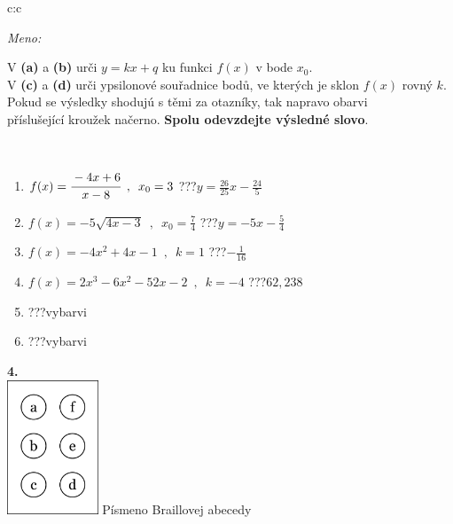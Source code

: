 \documentclass[10pt]{report}
\begin{document}
\begin{tabular}{c:c}
\begin{minipage}[c][104.5mm][t]{0.5\linewidth}
\begin{center}
\textit{Meno:}\phantom{xxxxxxxxxxxxxxxxxxxxxxxxxxxxxxxxxxxxxxxxxxxxxxxxxxxxxxxxxxxxxxxxx}\\[5mm]
\begin{minipage}{0.95\linewidth}
\begin{center}
V \textbf{(a)} a \textbf{(b)} urči  $y = kx + q$ ku funkci $f(x)$ v bode $x_0$.\\V \textbf{(c)} a \textbf{(d)} urči ypsilonové souřadnice bodů, ve kterých je sklon $f(x)$ rovný $k$.\\Pokud se výsledky shodujú s těmi za otazníky, tak napravo obarvi\\příslušející kroužek načerno. \textbf{Spolu odevzdejte výsledné slovo}.
\end{center}
\end{minipage}
\\[1mm]
\begin{minipage}{0.79\linewidth}
\begin{center}
\begin{varwidth}{\linewidth}
\begin{enumerate}
\small
\item $f(x)=\cfrac{-4x+6}{x-8}\enspace , \enspace x_0=3$\quad \dotfill\; ???\;\dotfill \quad $y = \frac{26}{25}x-\frac{24}{5}$
\item $f(x)=-5\sqrt{4x-3}\enspace , \enspace x_0=\frac{7}{4}$\quad \dotfill\; ???\;\dotfill \quad $y = -5x-\frac{5}{4}$
\item $f(x)=-4x^2+4x-1\enspace , \enspace k=1$\quad \dotfill\; ???\;\dotfill \quad $-\frac{1}{16}$
\item $f(x)=2x^3-6x^2-52x-2\enspace , \enspace k=-4$\quad \dotfill\; ???\;\dotfill \quad $62 , 238$
\item \quad \dotfill\; ???\;\dotfill \quad vybarvi
\item \quad \dotfill\; ???\;\dotfill \quad vybarvi
\end{enumerate}
\end{varwidth}
\end{center}
\end{minipage}
\begin{minipage}{0.20\linewidth}
\begin{center}
{\Huge\bfseries 4.} \\[2mm]
\includegraphics[height=40mm]{../images/braille.png}
{\small Písmeno Braillovej abecedy}
\end{center}
\end{minipage}
\end{center}
\end{minipage}
%
\end{tabular}
\end{document}
